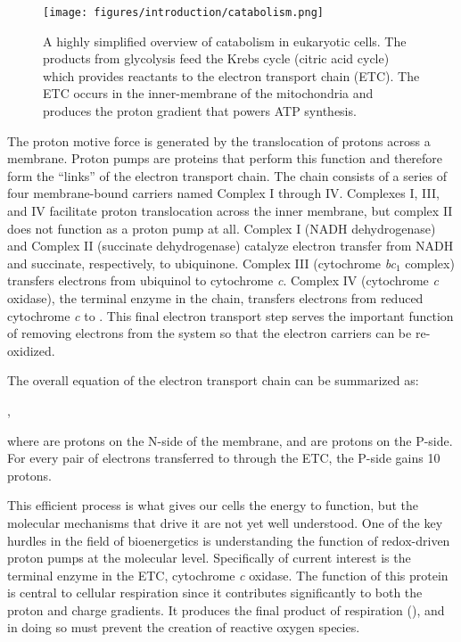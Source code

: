 \begin{figure}[htbp]
\centering
\texttt{[image: figures/introduction/catabolism.png]}
\caption[A highly simplified overview of catabolism in eukaryotic cells.]{A highly simplified overview of catabolism in eukaryotic cells. The products from glycolysis feed the Krebs cycle (citric acid cycle) which provides reactants to the electron transport chain (ETC). The ETC occurs in the inner-membrane of the mitochondria and produces the proton gradient that powers ATP synthesis.}
\label{fig:catabolism}
\end{figure}

The proton motive force is generated by the translocation of protons across a membrane. Proton pumps are proteins that perform this function and therefore form the ``links'' of the electron transport chain. The chain consists of a series of four membrane-bound carriers named Complex I through IV. Complexes I, III, and IV facilitate proton translocation across the inner membrane, but complex II does not function as a proton pump at all. Complex I (NADH dehydrogenase) and Complex II (succinate dehydrogenase) catalyze electron transfer from NADH and succinate, respectively, to ubiquinone. Complex III (cytochrome \emph{bc}$_1$ complex) transfers electrons from ubiquinol to cytochrome \emph{c}. Complex IV (cytochrome \emph{c} oxidase), the terminal enzyme in the chain, transfers electrons from reduced cytochrome \emph{c} to . This final electron transport step serves the important function of removing electrons from the system so that the electron carriers can be re-oxidized.

The overall equation of the electron transport chain can be summarized as:
\begin{center}
,
\end{center}
where  are protons on the N-side of the membrane, and  are protons on the P-side. For every pair of electrons transferred to  through the ETC, the P-side gains 10 protons.

This efficient process is what gives our cells the energy to function, but the molecular mechanisms that drive it are not yet well understood. One of the key hurdles in the field of bioenergetics is understanding the function of redox-driven proton pumps at the molecular level. Specifically of current interest is the terminal enzyme in the ETC, cytochrome \emph{c} oxidase. The function of this protein is central to cellular respiration since it contributes significantly to both the proton and charge gradients. It produces the final product of respiration (), and in doing so must prevent the creation of reactive oxygen species.

